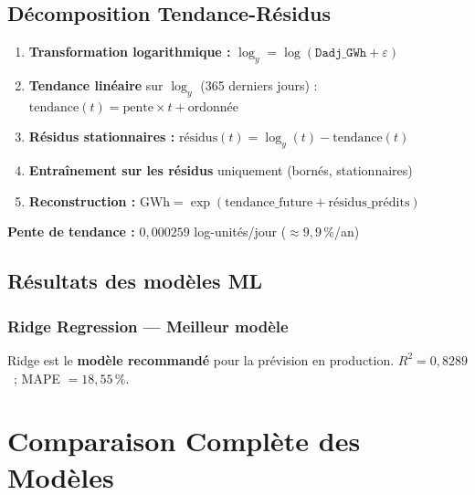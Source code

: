 \documentclass[12pt,a4paper]{article}
\begin{document}
\subsection{Décomposition Tendance-Résidus}

\begin{formulebox}
\begin{enumerate}
  \item \textbf{Transformation logarithmique :}
        $\log_y = \log(\texttt{Dadj\_GWh} + \varepsilon)$
  \item \textbf{Tendance linéaire} sur $\log_y$ (365 derniers jours) :
        $\text{tendance}(t) = \text{pente} \times t + \text{ordonnée}$
  \item \textbf{Résidus stationnaires :}
        $\text{résidus}(t) = \log_y(t) - \text{tendance}(t)$
  \item \textbf{Entraînement sur les résidus} uniquement (bornés, stationnaires)
  \item \textbf{Reconstruction :}
        $\text{GWh} = \exp(\text{tendance\_future} + \text{résidus\_prédits})$
\end{enumerate}
\textbf{Pente de tendance :} $0{,}000259$ log-unités/jour ($\approx 9{,}9\,\%$/an)
\end{formulebox}

\subsection{Résultats des modèles ML}

\subsubsection{Ridge Regression --- Meilleur modèle}

\begin{conclusionbox}
Ridge est le \textbf{modèle recommandé} pour la prévision en production.
$R^2 = 0{,}8289$~; MAPE $= 18{,}55\,\%$.
\end{conclusionbox}

\section{Comparaison Complète des Modèles}
\end{document}
